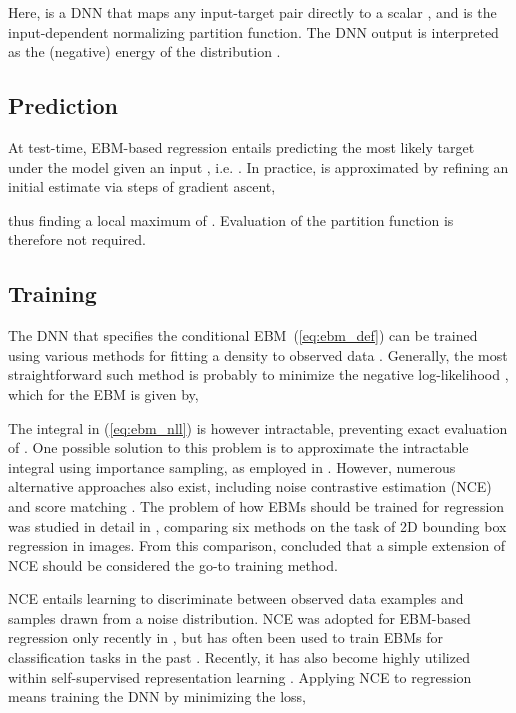 \documentclass[letterpaper, 10 pt, conference]{ieeeconf}
\begin{document}
Here,  is a DNN that maps any input-target pair  directly to a scalar , and  is the input-dependent normalizing partition function. The DNN output  is interpreted as the (negative) energy of the distribution .

\subsection{Prediction}
\label{section:ebms_regression_pred}
At test-time, EBM-based regression entails predicting the most likely target under the model given an input , i.e. . In practice,  is approximated by refining an initial estimate  via  steps of gradient ascent,
 
thus finding a local maximum of . Evaluation of the partition function  is therefore not required.

\subsection{Training}
\label{section:ebms_regression_train}
The DNN  that specifies the conditional EBM~(\ref{eq:ebm_def}) can be trained using various methods for fitting a density  to observed data . Generally, the most straightforward such method is probably to minimize the negative log-likelihood , which for the EBM  is given by,  

The integral in (\ref{eq:ebm_nll}) is however intractable, preventing exact evaluation of . One possible solution to this problem is to approximate the intractable integral using importance sampling, as employed in \cite{gustafsson2019learning}. However, numerous alternative approaches also exist, including noise contrastive estimation (NCE) \cite{gutmann2010noise} and score matching \cite{hyvarinen2005estimation}. The problem of how EBMs should be trained for regression was studied in detail in \cite{gustafsson2020train}, comparing six  methods on the task of 2D bounding box regression in images. From this comparison, \cite{gustafsson2020train} concluded that a simple extension of NCE should be considered the go-to training method.



NCE entails learning to discriminate between observed data examples and samples drawn from a noise distribution. NCE was adopted for EBM-based regression only recently in \cite{gustafsson2020train}, but has often been used to train EBMs for classification tasks in the past \cite{mnih2012fast, mikolov2013distributed, jozefowicz2016exploring, ma2018noise}. Recently, it has also become highly utilized within self-supervised representation learning \cite{hjelm2018learning, bachman2019learning, chen2020simple, han2020self}. Applying NCE to regression means training the DNN  by minimizing the loss,
\end{document}
